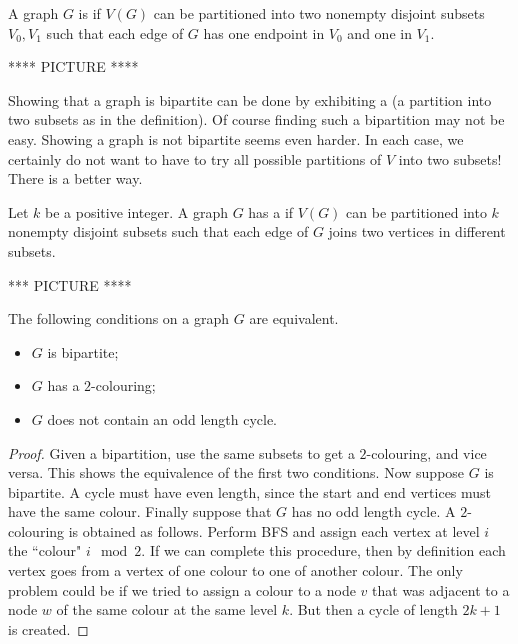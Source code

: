 \begin{Definition}

A graph $G$ is  if $V(G)$  can be partitioned into
two nonempty disjoint subsets $V_0, V_1$ such that each edge of $G$
has one endpoint in $V_0$ and one in $V_1$.

\end{Definition}

\begin{Example}

**** PICTURE ****

\end{Example}

Showing that a graph is bipartite can be done by exhibiting a
 (a partition into two subsets as in the
definition). Of course finding such a bipartition may not be easy. Showing
a graph is not bipartite seems even harder. In each case, we certainly
do not want to have to try all possible partitions of $V$ into two
subsets! There is a better way.

\begin{Definition}
Let $k$ be a positive integer. A graph $G$ has a 
if $V(G)$ can be partitioned into $k$ nonempty disjoint subsets such
that each edge of $G$ joins two vertices in different subsets.
\end{Definition}

\begin{Example}

*** PICTURE ****

\end{Example}

\begin{Theorem} The following conditions on a graph $G$ are equivalent.
\begin{itemize}
\item
$G$ is bipartite;
\item
$G$ has a $2$-colouring;
\item
$G$ does not contain an odd length cycle.
\end{itemize}
\end{Theorem}

\begin{proof} 

Given a bipartition, use the same subsets to get a $2$-colouring, and
vice versa. This shows the equivalence of the first two conditions. Now
suppose $G$ is bipartite.  A cycle must have even length, since the start
and end vertices must have the same colour. Finally suppose that $G$
has no odd length cycle. A $2$-colouring is obtained as follows. Perform
BFS and assign each vertex at level $i$ the ``colour" $i \mod 2$. If we
can complete this procedure, then by definition each vertex goes from
a vertex of one colour to one of another colour. The only problem could
be if we tried to assign a colour to a node $v$ that was adjacent to a
node $w$ of the same colour at the same level $k$. But then a cycle of
length $2k+1$ is created.
\end{proof}

